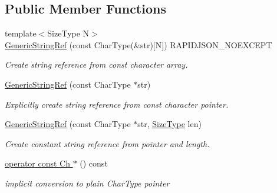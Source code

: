 \subsection*{Public Member Functions}
\begin{DoxyCompactItemize}
\item 
{\footnotesize template$<$Size\+Type N$>$ }\\\hyperlink{struct_generic_string_ref_aae0c070f914d2486a560150a927c22dc}{Generic\+String\+Ref} (const Char\+Type(\&str)\mbox{[}N\mbox{]}) R\+A\+P\+I\+D\+J\+S\+O\+N\+\_\+\+N\+O\+E\+X\+C\+E\+P\+T
\begin{DoxyCompactList}\small\item\em Create string reference from {\ttfamily const} character array. \end{DoxyCompactList}\item 
\hyperlink{struct_generic_string_ref_a9e80d81d5ad49cf0fb4128ace8c548d9}{Generic\+String\+Ref} (const Char\+Type $\ast$str)
\begin{DoxyCompactList}\small\item\em Explicitly create string reference from {\ttfamily const} character pointer. \end{DoxyCompactList}\item 
\hyperlink{struct_generic_string_ref_a8b2c6a7fdc4da1e7055f7fdcf0ac517f}{Generic\+String\+Ref} (const Char\+Type $\ast$str, \hyperlink{rapidjson_8h_a5ed6e6e67250fadbd041127e6386dcb5}{Size\+Type} len)
\begin{DoxyCompactList}\small\item\em Create constant string reference from pointer and length. \end{DoxyCompactList}\item 
\hypertarget{struct_generic_string_ref_a61a4241c23f65626ddc1da4ae5dac1b8}{}\hyperlink{struct_generic_string_ref_a61a4241c23f65626ddc1da4ae5dac1b8}{operator const Ch $\ast$} () const \label{struct_generic_string_ref_a61a4241c23f65626ddc1da4ae5dac1b8}

\begin{DoxyCompactList}\small\item\em implicit conversion to plain Char\+Type pointer \end{DoxyCompactList}\end{DoxyCompactItemize}
